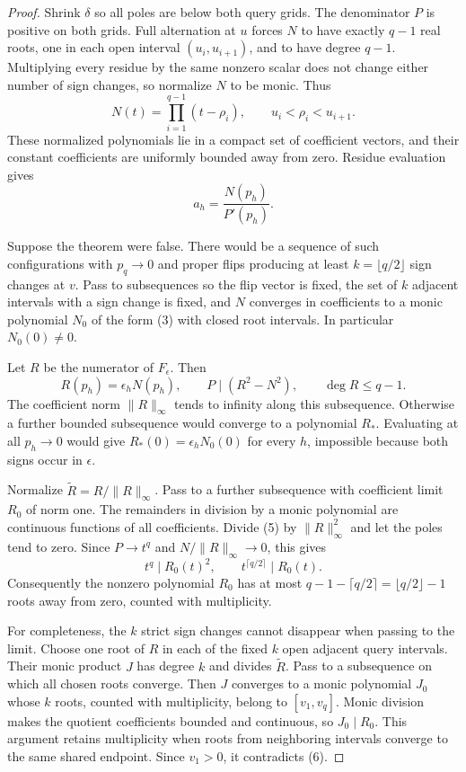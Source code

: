 \documentclass[11pt]{article}
\begin{document}
\begin{proof}
Shrink $\delta$ so all poles are below both query grids. The
denominator $P$ is positive on both grids. Full alternation at $u$
forces $N$ to have exactly $q-1$ real roots, one in each open interval
$(u_i,u_{i+1})$, and to have degree $q-1$. Multiplying every residue
by the same nonzero scalar does not change either number of sign
changes, so normalize $N$ to be monic. Thus
\[
 N(t)=\prod_{i=1}^{q-1}(t-\rho_i),\qquad
 u_i<\rho_i<u_{i+1}.
 \tag{3}
\]
These normalized polynomials lie in a compact set of coefficient
vectors, and their constant coefficients are uniformly bounded away
from zero. Residue evaluation gives
\[
 a_h=\frac{N(p_h)}{P'(p_h)}.
 \tag{4}
\]

Suppose the theorem were false. There would be a sequence of such
configurations with $p_q\longrightarrow0$ and proper flips producing
at least $k=\lfloor q/2\rfloor$ sign changes at $v$. Pass to
subsequences so the flip vector is fixed, the set of $k$ adjacent
intervals with a sign change is fixed, and $N$ converges in
coefficients to a monic polynomial $N_0$ of the form (3) with closed
root intervals. In particular $N_0(0)\neq0$.

Let $R$ be the numerator of $F_\epsilon$. Then
\[
 R(p_h)=\epsilon_h N(p_h),\qquad
 P\mid(R^2-N^2),\qquad \deg R\leq q-1.
 \tag{5}
\]
The coefficient norm $\|R\|_\infty$ tends to infinity along this
subsequence. Otherwise a further bounded subsequence would converge
to a polynomial $R_*$. Evaluating at all $p_h\longrightarrow0$
would give $R_*(0)=\epsilon_h N_0(0)$ for every $h$, impossible
because both signs occur in $\epsilon$.

Normalize $\widetilde R=R/\|R\|_\infty$. Pass to a further
subsequence with coefficient limit $R_0$ of norm one. The remainders
in division by a monic polynomial are continuous functions of all
coefficients. Divide (5) by $\|R\|_\infty^2$ and let the poles
tend to zero. Since $P\longrightarrow t^q$ and
$N/\|R\|_\infty\longrightarrow0$, this gives
\[
 t^q\mid R_0(t)^2,
 \qquad
 t^{\lceil q/2\rceil}\mid R_0(t).
 \tag{6}
\]
Consequently the nonzero polynomial $R_0$ has at most
$q-1-\lceil q/2\rceil=\lfloor q/2\rfloor-1$ roots away from
zero, counted with multiplicity.

For completeness, the $k$ strict sign changes cannot disappear when
passing to the limit. Choose one root of $R$ in each of the fixed
$k$ open adjacent query intervals. Their monic product $J$ has degree
$k$ and divides $\widetilde R$. Pass to a subsequence on which all
chosen roots converge. Then $J$ converges to a monic polynomial
$J_0$ whose $k$ roots, counted with multiplicity, belong to
$[v_1,v_q]$. Monic division makes the quotient coefficients bounded
and continuous, so $J_0\mid R_0$. This argument retains multiplicity
when roots from neighboring intervals converge to the same shared
endpoint. Since $v_1>0$, it contradicts (6).
\end{proof}
\end{document}
